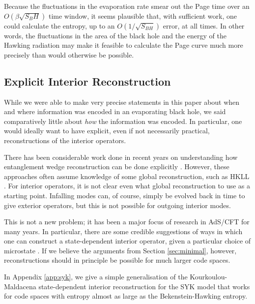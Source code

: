 \documentclass[12pt]{article}
\begin{document}
Because the fluctuations in the evaporation rate smear out the Page time over an $O(\beta \sqrt{S_BH})$ time window, it seems plausible that, with sufficient work, one could calculate the entropy, up to an $O(1/\sqrt{S_{BH}})$ error, at all times. In other words, the fluctuations in the area of the black hole and the energy of the Hawking radiation may make it feasible to calculate the Page curve much more precisely than would otherwise be possible.

\subsection{Explicit Interior Reconstruction} \label{sec:explicit}
While we were able to make very precise statements in this paper about when and where information was encoded in an evaporating black hole, we said comparatively little about \emph{how} the information was encoded. In particular, one would ideally want to have explicit, even if not necessarily practical, reconstructions of the interior operators. 

There has been considerable work done in recent years on understanding how entanglement wedge reconstruction can be done explicitly \cite{cotler2017entanglement, faulkner2017bulk, chen2019entanglement}. However, these approaches often assume knowledge of some global reconstruction, such as HKLL \cite{hamilton2006local}. For interior operators, it is not clear even what global reconstruction to use as a starting point. Infalling modes can, of course, simply be evolved back in time to give exterior operators, but this is not possible for outgoing interior modes. 

This is not a new problem; it has been a major focus of research in AdS/CFT for many years. In particular, there are some credible suggestions of ways in which one can construct a state-dependent interior operator, given a particular choice of microstate \cite{papadodimas2013infalling, papadodimas2014state, kourkoulou2017pure}. If we believe the arguments from Section \ref{sec:minimal}, however, reconstructions should in principle be possible for much larger code spaces.

In Appendix \ref{app:syk}, we give a simple generalisation of the Kourkoulou-Maldacena state-dependent interior reconstruction for the SYK model that works for code spaces with entropy almost as large as the Bekenstein-Hawking entropy.
\end{document}
